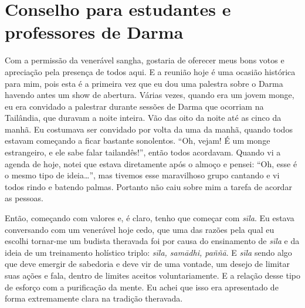 
\chapter{Conselho para estudantes e professores de Darma}
\markright{\theChapterAuthor}

Com a permissão da venerável sangha, gostaria de oferecer meus bons
votos e apreciação pela presença de todos aqui. E a reunião hoje é uma
ocasião histórica para mim, pois esta é a primeira vez que eu dou uma
palestra sobre o Darma havendo antes um show de abertura. Várias vezes,
quando era um jovem monge, eu era convidado a palestrar durante sessões
de Darma que ocorriam na Tailândia, que duravam a noite inteira. Vão
das oito da noite até as cinco da manhã. Eu costumava ser convidado por
volta da uma da manhã, quando todos estavam começando a ficar bastante
sonolentos. “Oh, vejam! É um monge estrangeiro, e ele sabe falar
tailandês!”, então todos acordavam. Quando vi a agenda de hoje, notei
que estava diretamente após o almoço e pensei: “Oh, esse é o mesmo tipo
de ideia\ldots{}”, mas tivemos esse maravilhoso grupo cantando e vi todos
rindo e batendo palmas. Portanto não caiu sobre mim a tarefa de acordar
as pessoas. 

Então, começando com valores e, é claro, tenho que começar com
\emph{sīla}. Eu estava conversando com um venerável hoje cedo, que
uma das razões pela qual eu escolhi tornar-me um budista theravada foi
por causa do ensinamento de \emph{sīla} e da ideia de um
treinamento holístico triplo: \emph{sīla, samādhi, paññā}. E
\emph{sīla} sendo algo que deve emergir de sabedoria e deve vir de
uma vontade, um desejo de limitar suas ações e fala, dentro de limites
aceitos voluntariamente. E a relação desse tipo de esforço com a
purificação da mente. Eu achei que isso era apresentado de forma
extremamente clara na tradição theravada. 

